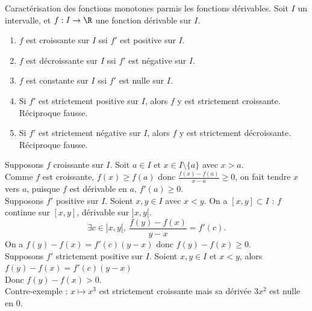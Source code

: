 \documentclass[11pt]{article}
\begin{document}
\begin{thm}{Caractérisation des fonctions monotones parmis les fonctions dérivables.}{}
    Soit $I$ un intervalle, et $f:I\to\R$ une fonction dérivable sur $I$.
    \begin{enumerate}
        \item $f$ est croissante sur $I$ ssi $f'$ est positive sur $I$.
        \item $f$ est décroissante sur $I$ ssi $f'$ est négative sur $I$.
        \item $f$ est constante sur $I$ ssi $f'$ est nulle sur $I$.
        \item Si $f'$ est strictement positive sur $I$, alors $f$ y est strictement croissante. Réciproque fausse.
        \item Si $f'$ est strictement négative sur $I$, alors $f$ y est strictement décroissante. Réciproque fausse.
    \end{enumerate}
    \tcblower
     Supposons $f$ croissante sur $I$. Soit $a\in I$ et $x\in I\setminus\{a\}$ avec $x>a$.\\
    Comme $f$ est croissante, $f(x)\geq f(a)$ donc $\frac{f(x)-f(a)}{x-a}\geq0$, on fait tendre $x$ vers $a$, puisque $f$ est dérivable en $a$, $f'(a)\geq0$.\\
    Supposons $f'$ positive sur $I$. Soient $x,y\in I$ avec $x < y$. On a $[x,y]\subset I$ : $f$ continue sur $[x,y]$, dérivable sur $]x,y[$.
    \begin{equation*}
        \exists c \in ]x,y[ ,~ \frac{f(y)-f(x)}{y-x}=f'(c).
    \end{equation*}
    On a $f(y)-f(x)=f'(c)(y-x)$ donc $f(y)-f(x)\geq0$.\\
     Supposons $f'$ strictement positive sur $I$. Soient $x,y\in I$ et $x<y$, alors $f(y)-f(x)=f'(c)(y-x)$\\
    Donc $f(y)-f(x)>0$.\\
    Contre-exemple : $x\mapsto x^3$ est strictement croissante mais sa dérivée $3x^2$ est nulle en 0. 
\end{thm}
\end{document}
